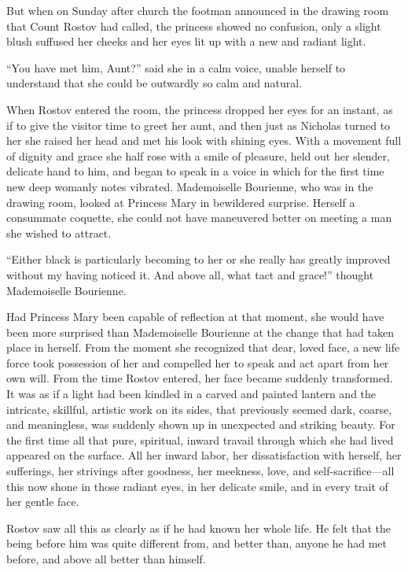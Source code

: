 But when on Sunday after church the footman announced in the
drawing room that Count Rostov had called, the princess showed no
confusion, only a slight blush suffused her cheeks and her eyes
lit up with a new and radiant light.

``You have met him, Aunt?'' said she in a calm voice, unable
herself to understand that she could be outwardly so calm and
natural.

When Rostov entered the room, the princess dropped her eyes for
an instant, as if to give the visitor time to greet her aunt, and
then just as Nicholas turned to her she raised her head and met
his look with shining eyes. With a movement full of dignity and
grace she half rose with a smile of pleasure, held out her
slender, delicate hand to him, and began to speak in a voice in
which for the first time new deep womanly notes
vibrated. Mademoiselle Bourienne, who was in the drawing room,
looked at Princess Mary in bewildered surprise. Herself a
consummate coquette, she could not have maneuvered better on
meeting a man she wished to attract.

``Either black is particularly becoming to her or she really has
greatly improved without my having noticed it. And above all,
what tact and grace!'' thought Mademoiselle Bourienne.

Had Princess Mary been capable of reflection at that moment, she
would have been more surprised than Mademoiselle Bourienne at the
change that had taken place in herself. From the moment she
recognized that dear, loved face, a new life force took
possession of her and compelled her to speak and act apart from
her own will. From the time Rostov entered, her face became
suddenly transformed. It was as if a light had been kindled in a
carved and painted lantern and the intricate, skillful, artistic
work on its sides, that previously seemed dark, coarse, and
meaningless, was suddenly shown up in unexpected and striking
beauty. For the first time all that pure, spiritual, inward
travail through which she had lived appeared on the surface. All
her inward labor, her dissatisfaction with herself, her
sufferings, her strivings after goodness, her meekness, love, and
self-sacrifice---all this now shone in those radiant eyes, in her
delicate smile, and in every trait of her gentle face.

Rostov saw all this as clearly as if he had known her whole
life. He felt that the being before him was quite different from,
and better than, anyone he had met before, and above all better
than himself.

